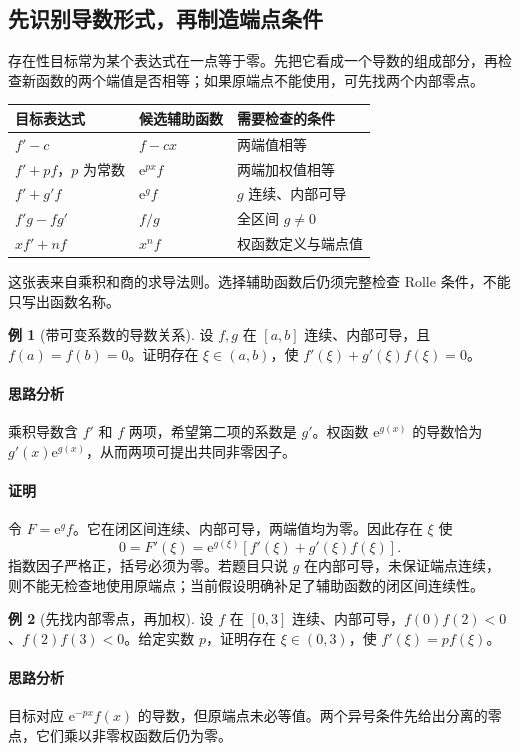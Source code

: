 \documentclass[UTF8,fontset=fandol,12pt,oneside,openany]{ctexrep}
\newcommand{\ee}{\mathrm e}
\theoremstyle{definition}
\newtheorem{example}{例}[chapter]
\begin{document}
\subsection{先识别导数形式，再制造端点条件}
存在性目标常为某个表达式在一点等于零。先把它看成一个导数的组成部分，再检查新函数的两个端值是否相等；如果原端点不能使用，可先找两个内部零点。
\begin{center}
\begin{tabular}{lll}
\toprule
目标表达式 & 候选辅助函数 & 需要检查的条件\\
\midrule
$f'-c$ & $f-cx$ & 两端值相等\\
$f'+pf$，$p$ 为常数 & $\ee^{px}f$ & 两端加权值相等\\
$f'+g'f$ & $\ee^gf$ & $g$ 连续、内部可导\\
$f'g-fg'$ & $f/g$ & 全区间 $g\ne0$\\
$xf'+nf$ & $x^nf$ & 权函数定义与端点值\\
\bottomrule
\end{tabular}
\end{center}
这张表来自乘积和商的求导法则。选择辅助函数后仍须完整检查 Rolle 条件，不能只写出函数名称。

\begin{example}[带可变系数的导数关系]
设 $f,g$ 在 $[a,b]$ 连续、内部可导，且 $f(a)=f(b)=0$。证明存在 $\xi\in(a,b)$，使 $f'(\xi)+g'(\xi)f(\xi)=0$。
\end{example}
\paragraph{思路分析}
乘积导数含 $f'$ 和 $f$ 两项，希望第二项的系数是 $g'$。权函数 $\ee^{g(x)}$ 的导数恰为 $g'(x)\ee^{g(x)}$，从而两项可提出共同非零因子。
\paragraph{证明}
令 $F=\ee^gf$。它在闭区间连续、内部可导，两端值均为零。因此存在 $\xi$ 使
\[
0=F'(\xi)=\ee^{g(\xi)}[f'(\xi)+g'(\xi)f(\xi)].
\]
指数因子严格正，括号必须为零。若题目只说 $g$ 在内部可导，未保证端点连续，则不能无检查地使用原端点；当前假设明确补足了辅助函数的闭区间连续性。

\begin{example}[先找内部零点，再加权]
设 $f$ 在 $[0,3]$ 连续、内部可导，$f(0)f(2)<0$、$f(2)f(3)<0$。给定实数 $p$，证明存在 $\xi\in(0,3)$，使 $f'(\xi)=pf(\xi)$。
\end{example}
\paragraph{思路分析}
目标对应 $\ee^{-px}f(x)$ 的导数，但原端点未必等值。两个异号条件先给出分离的零点，它们乘以非零权函数后仍为零。
\end{document}
